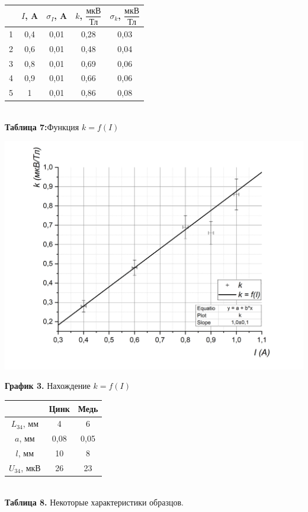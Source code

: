 \documentclass[a4paper, 12pt]{article}%
\begin{document}
\begin{center}
\begin{tabular}{|c|c|c|c|c|}
\hline
 & $I$, A & $\sigma_{I}$, A & $k$, $\dfrac{\text{мкВ}}{\text{Тл}}$ & $\sigma_k$, $\dfrac{\text{мкВ}}{\text{Тл}}$ \\ \hline
1 & 0,4 & 0,01 & 0,28 & 0,03 \\ \hline
2 & 0,6 & 0,01 & 0,48 & 0,04 \\ \hline
3 & 0,8 & 0,01 & 0,69 & 0,06 \\ \hline
4 & 0,9 & 0,01 & 0,66 & 0,06 \\ \hline
5 & 1 & 0,01 & 0,86 & 0,08 \\ \hline
\end{tabular}\\
\textbf{Таблица 7:}Функция $k = f(I)$
\end{center}
\includegraphics[width = \textwidth]{3.jpg}\\
\begin{center}
\textbf{График 3.} Нахождение $k = f(I)$
\end{center}
\begin{center}
\begin{tabular}{|c|c|c|}
\hline
 & Цинк & Медь \\ \hline
$L_{34}$, мм & 4 & 6 \\ \hline
$a$, мм & 0,08 & 0,05 \\ \hline
$l$, мм & 10 & 8 \\ \hline
$U_{34}$, мкВ & 26 & 23 \\ \hline 
\end{tabular}\\
\textbf{Таблица 8.} Некоторые характеристики образцов.
\end{center}
\end{document}

